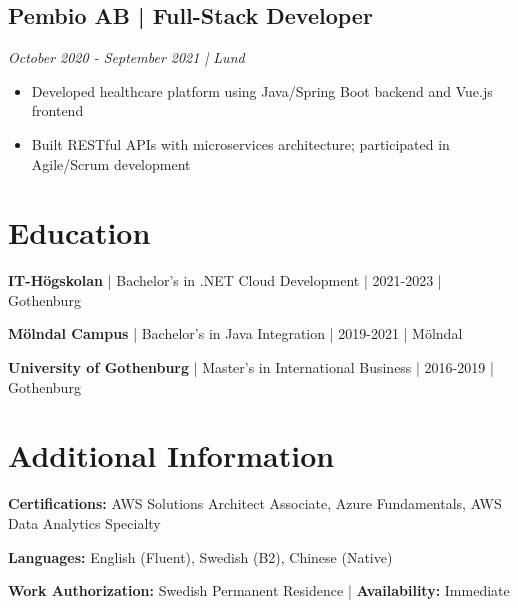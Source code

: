 \documentclass[11pt,a4paper]{article}
\begin{document}
\subsection*{Pembio AB | Full-Stack Developer}
\textit{October 2020 - September 2021 | Lund}

\begin{itemize}[leftmargin=*, itemsep=1pt]
\item Developed healthcare platform using Java/Spring Boot backend and Vue.js frontend
\item Built RESTful APIs with microservices architecture; participated in Agile/Scrum development
\end{itemize}

\section*{Education}

\textbf{IT-Högskolan} | Bachelor's in .NET Cloud Development | 2021-2023 | Gothenburg

\textbf{Mölndal Campus} | Bachelor's in Java Integration | 2019-2021 | Mölndal

\textbf{University of Gothenburg} | Master's in International Business | 2016-2019 | Gothenburg

\section*{Additional Information}

\textbf{Certifications:} AWS Solutions Architect Associate, Azure Fundamentals, AWS Data Analytics Specialty

\textbf{Languages:} English (Fluent), Swedish (B2), Chinese (Native)

\textbf{Work Authorization:} Swedish Permanent Residence | \textbf{Availability:} Immediate
\end{document}
